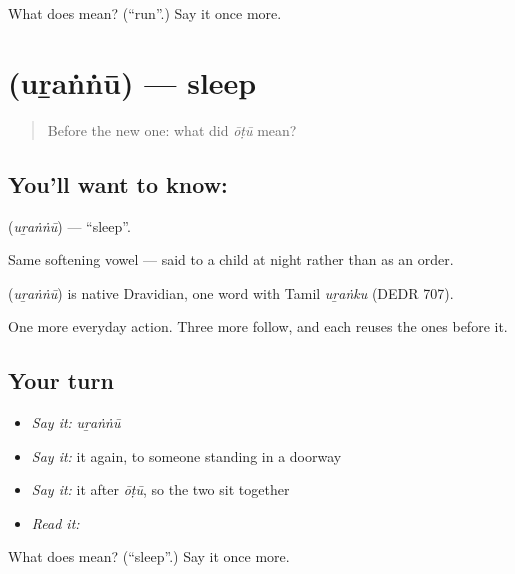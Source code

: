 \begin{tcolorbox}[breakable,colback=teal!4,colframe=teal!35!black,title={Before you move on}]
What does  mean? (\textquotedblleft{}run\textquotedblright{}.) Say it once more.
\end{tcolorbox}
\section[\texorpdfstring{\ml{ഉറങ്ങൂ} (uṟaṅṅū)}{ഉറങ്ങൂ (uṟaṅṅū)}]{ (uṟaṅṅū) — sleep}

\label{lesson:ML-C43-sleep}



\begin{quote}
Before the new one: what did \emph{ōṭū} mean?
\end{quote}

\subsection*{You'll want to know: }
\textbf{} (\emph{uṟaṅṅū}) — \textquotedblleft{}sleep\textquotedblright{}.

Same softening vowel — said to a child at night rather than as an order.

\begin{cousinweb}
\textbf{} (\emph{uṟaṅṅū}) is native Dravidian, one word with Tamil \emph{uṟaṅku} (DEDR 707).
\end{cousinweb}

\begin{grammarlens}[title={What you've built}]
One more everyday action. Three more follow, and each reuses the ones before it.
\end{grammarlens}

\subsection*{Your turn}
\begin{itemize}
\raggedright
  \item \emph{Say it:} \emph{uṟaṅṅū}
  \item \emph{Say it:} it again, to someone standing in a doorway
  \item \emph{Say it:} it after \emph{ōṭū}, so the two sit together
  \item \emph{Read it:} \textbf{}
\end{itemize}

\begin{tcolorbox}[breakable,colback=teal!4,colframe=teal!35!black,title={Before you move on}]
What does  mean? (\textquotedblleft{}sleep\textquotedblright{}.) Say it once more.
\end{tcolorbox}
